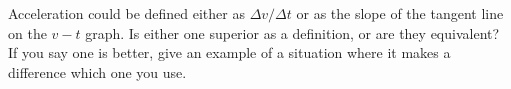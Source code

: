  Acceleration could be defined either as
 $\Delta v/\Delta t$ or as the slope of the tangent line on the $v-t$ graph.
Is either one superior as a definition, or are they
equivalent? If you say one is better, give an example of a
situation where it makes a difference which one you use.
